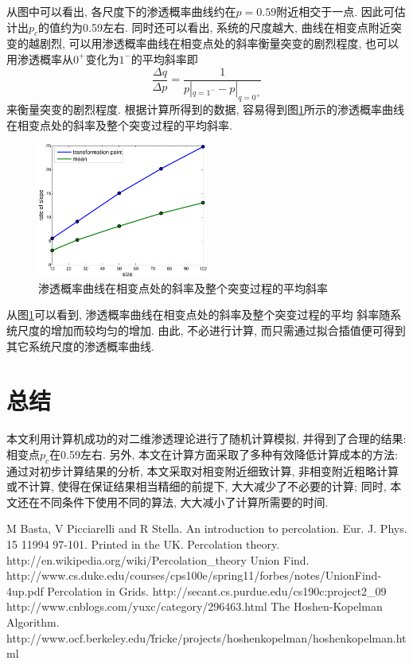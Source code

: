 \documentclass[11pt,a4paper,boxed]{caspset}
\begin{document}
从图中可以看出, 各尺度下的渗透概率曲线约在$p=0.59$附近相交于一点. 因此可估计出$p_c$的值约为0.59左右.
同时还可以看出, 系统的尺度越大, 曲线在相变点附近突变的越剧烈, 可以用渗透概率曲线在相变点处的斜率衡量突变的剧烈程度, 也可以用渗透概率从$0^+$变化为$1^-$的平均斜率即
\[
\frac{\Delta q}{\Delta p} = \frac{1}{p|_{q=1^-} - p|_{q=0^+}}
\]
来衡量突变的剧烈程度. 根据计算所得到的数据, 容易得到图\ref{slope}所示的渗透概率曲线在相变点处的斜率及整个突变过程的平均斜率.
\begin{figure}[!htb]
\centering
\includegraphics[width=0.5\textwidth]{slope.pdf}
\caption{\label{slope}渗透概率曲线在相变点处的斜率及整个突变过程的平均斜率}
\end{figure}
从图\ref{slope}可以看到, 渗透概率曲线在相变点处的斜率及整个突变过程的平均
斜率随系统尺度的增加而较均匀的增加. 由此, 不必进行计算, 而只需通过拟合插值便可得到其它系统尺度的渗透概率曲线.
\section{总结}

本文利用计算机成功的对二维渗透理论进行了随机计算模拟, 并得到了合理的结果: 相变点$p_c$在0.59左右. 另外, 本文在计算方面采取了多种有效降低计算成本的方法: 通过对初步计算结果的分析, 本文采取对相变附近细致计算, 非相变附近粗略计算或不计算, 使得在保证结果相当精细的前提下, 大大减少了不必要的计算;
同时, 本文还在不同条件下使用不同的算法, 大大减小了计算所需要的时间.



\begin{thebibliography}{99}
 M Basta, V Picciarelli and R Stella. An introduction to percolation. Eur. J. Phys. 15 11994 97-101. Printed in the UK.
 Percolation theory. http://en.wikipedia.org/wiki/Percolation\_theory
 Union Find. http://www.cs.duke.edu/courses/cps100e/spring11/forbes/notes/UnionFind-4up.pdf
 Percolation in Grids. http://secant.cs.purdue.edu/cs190c:project2\_09\\
    http://www.cnblogs.com/yuxc/category/296463.html
 The Hoshen-Kopelman Algorithm. \\ http://www.ocf.berkeley.edu/\~fricke/projects/hoshenkopelman/hoshenkopelman.html

\end{thebibliography}
\end{document}
